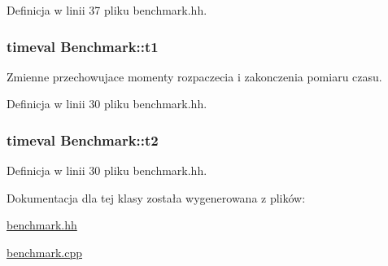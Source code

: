Definicja w linii 37 pliku benchmark.\-hh.

\hypertarget{class_benchmark_ab951e55dc4470926e0eb0761804f13bc}{
\subsubsection[{t1}]{\setlength{\rightskip}{0pt plus 5cm}timeval Benchmark\-::t1\hspace{0.3cm}{\ttfamily [private]}}}\label{class_benchmark_ab951e55dc4470926e0eb0761804f13bc}
Zmienne przechowujace momenty rozpaczecia i zakonczenia pomiaru czasu. 

Definicja w linii 30 pliku benchmark.\-hh.

\hypertarget{class_benchmark_a2b145dd2458fea33d6df41f310058bec}{
\subsubsection[{t2}]{\setlength{\rightskip}{0pt plus 5cm}timeval Benchmark\-::t2\hspace{0.3cm}{\ttfamily [private]}}}\label{class_benchmark_a2b145dd2458fea33d6df41f310058bec}


Definicja w linii 30 pliku benchmark.\-hh.



Dokumentacja dla tej klasy została wygenerowana z plików\-:\begin{DoxyCompactItemize}
\item 
\hyperlink{benchmark_8hh}{benchmark.\-hh}\item 
\hyperlink{benchmark_8cpp}{benchmark.\-cpp}\end{DoxyCompactItemize}
